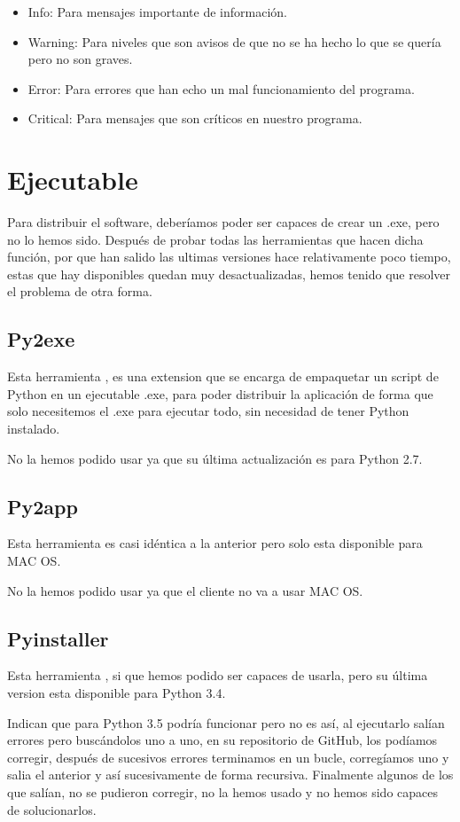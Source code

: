 \begin{itemize}
\item Info: Para mensajes importante de información.
\item Warning: Para niveles que son avisos de que no se ha hecho lo que se quería pero no son graves.
\item Error: Para errores que han echo un mal funcionamiento del programa.
\item Critical: Para mensajes que son críticos en nuestro programa.
\end{itemize}

\section{Ejecutable}
Para distribuir el software, deberíamos poder ser capaces de crear un .exe, pero no lo hemos sido.
Después de probar todas las herramientas que hacen dicha función,  por que han salido las ultimas versiones hace relativamente poco tiempo, estas que hay disponibles quedan muy desactualizadas, hemos tenido que resolver el problema de otra forma. 

\subsection{Py2exe}
Esta herramienta \cite{p2exe}, es una extension que se encarga de empaquetar un script de Python en un ejecutable .exe, para poder distribuir la aplicación de forma que solo necesitemos el .exe para ejecutar todo, sin necesidad de tener Python instalado.

No la hemos podido usar ya que su última actualización es para Python 2.7.

\subsection{Py2app}
Esta herramienta es casi idéntica a la anterior pero solo esta disponible para MAC OS.

No la hemos podido usar ya que el cliente no va a usar MAC OS.

\subsection{Pyinstaller}
Esta herramienta \cite{Pyinstaller}, si que hemos podido ser capaces de usarla, pero su última version esta disponible para Python 3.4.

Indican que para Python 3.5 podría funcionar pero no es así,
al ejecutarlo salían errores pero buscándolos uno a uno, en su repositorio de GitHub, los podíamos corregir, después de sucesivos errores terminamos en un bucle, corregíamos uno y salia el anterior y así sucesivamente de forma recursiva. 
Finalmente algunos de los que salían, no se pudieron corregir, 
no la hemos usado y no hemos sido capaces de solucionarlos.

